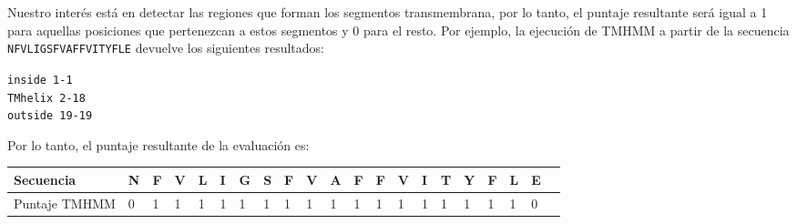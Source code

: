 Nuestro interés está en detectar las regiones que forman los segmentos transmembrana, por lo tanto, el puntaje resultante será igual a 1 para aquellas posiciones que pertenezcan a estos segmentos y 0 para el resto. 
Por ejemplo, la ejecución de TMHMM a partir de la secuencia \texttt{NFVLIGSFVAFFVITYFLE} devuelve los siguientes resultados: 

\texttt{inside         1-1}\\
\indent \texttt{TMhelix   2-18}\\
\indent \texttt{outside	    19-19}

Por lo tanto, el puntaje resultante de la evaluación es:

\vspace{0.5cm}
\noindent
\begin{tabular}{lllllllllllllllllllll} 
\hline 
Secuencia & \textbf{N} & \textbf{F} & \textbf{V} & \textbf{L} & \textbf{I} & \textbf{G} & \textbf{S} & \textbf{F} & \textbf{V} & \textbf{A} & \textbf{F} & \textbf{F} & \textbf{V} & \textbf{I} & \textbf{T} & \textbf{Y} & \textbf{F} & \textbf{L} & \textbf{E}  \\ \hline
Puntaje TMHMM & 0 & 1 & 1 & 1 & 1 & 1 & 1 & 1 & 1 & 1 & 1 & 1 & 1 & 1 & 1 & 1 & 1 & 1 & 0\\ \hline
\end{tabular}



 
 
 
 



% 
% 


